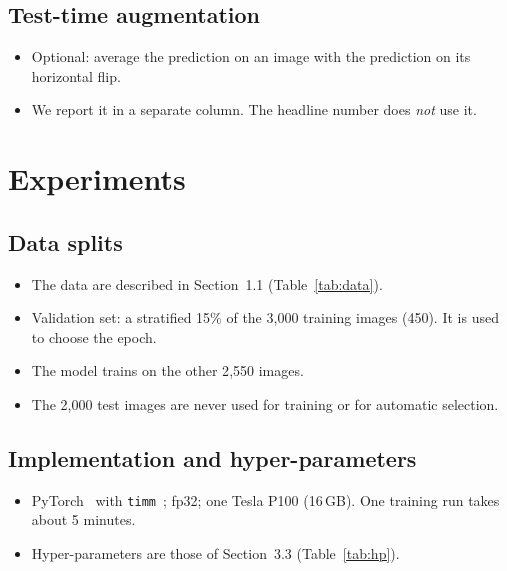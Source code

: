 \documentclass[11pt]{article}
\begin{document}
\subsection{Test-time augmentation}
\begin{itemize}
\item Optional: average the prediction on an image with the prediction on its horizontal flip.
\item We report it in a separate column. The headline number does \emph{not} use it.
\end{itemize}

\section{Experiments}
\subsection{Data splits}\label{sec:splits}
\begin{itemize}
\item The data are described in Section~1.1 (Table~\ref{tab:data}).
\item Validation set: a stratified 15\% of the 3{,}000 training images (450). It is used to choose the epoch.
\item The model trains on the other 2{,}550 images.
\item The 2{,}000 test images are never used for training or for automatic selection.
\end{itemize}

\subsection{Implementation and hyper-parameters}
\begin{itemize}
\item PyTorch~\cite{pytorch} with \texttt{timm}~\cite{timm}; fp32; one Tesla P100 (16\,GB). One training run takes about 5 minutes.
\item Hyper-parameters are those of Section~3.3 (Table~\ref{tab:hp}).
\end{itemize}
\end{document}
